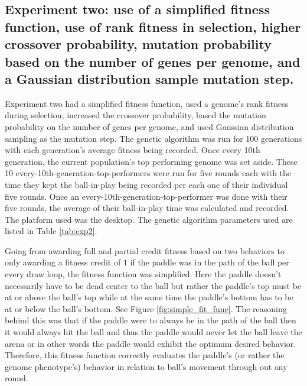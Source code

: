 \documentclass[a4paper,10pt]{article}
\begin{document}
\subsection{Experiment two: use of a simplified fitness function, use of rank fitness in selection, higher crossover probability, mutation probability based on the number of genes per genome, and a Gaussian distribution sample mutation step.}


Experiment two had a simplified fitness function, used a genome's rank fitness during selection, increased the crossover probability, based the mutation probability on the number of genes per genome, and used Gaussian distribution sampling as the mutation step. The genetic algorithm was run for 100 generations with each generation's average fitness being recorded. Once every 10th generation, the current population's top performing genome was set aside. These 10 every-10th-generation-top-performers were run for five rounds each with the time they kept the ball-in-play being recorded per each one of their individual five rounds. Once an every-10th-generation-top-performer was done with their five rounds, the average of their ball-in-play time was calculated and recorded. The platform used was the desktop. The genetic algorithm parameters used are listed in Table \ref{tab:exp2}.

Going from awarding full and partial credit fitness based on two behaviors to only awarding a fitness credit of $1$ if the paddle was in the path of the ball per every draw loop, the fitness function was simplified. Here the paddle doesn't necessarily have to be dead center to the ball but rather the paddle's top must be at or above the ball's top while at the same time the paddle's bottom has to be at or below the ball's bottom. See Figure \ref{fig:simple_fit_func}. The reasoning behind this was that if the paddle were to always be in the path of the ball then it would always hit the ball and thus the paddle would never let the ball leave the arena or in other words the paddle would exhibit the optimum desired behavior. Therefore, this fitness function correctly evaluates the paddle's (or rather the genome phenotype's) behavior in relation to ball's movement through out any round.
\end{document}
